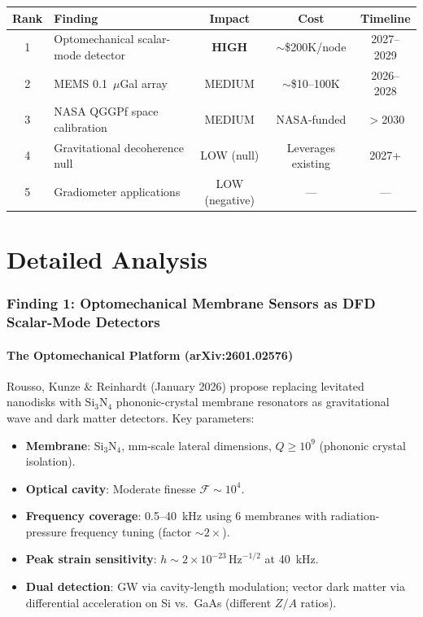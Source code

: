 \documentclass[11pt]{article}
\theoremstyle{definition}
\theoremstyle{remark}
\newcommand{\ee}[1]{\times10^{#1}}
\newcommand{\sqrtHz}{\,\mathrm{Hz}^{-1/2}}
\begin{document}
\begin{table}[H]
\centering
\small
\begin{tabular}{@{}clccc@{}}
\toprule
Rank & Finding & Impact & Cost & Timeline \\
\midrule
1 & Optomechanical scalar-mode detector & \textbf{HIGH} & $\sim$\$200K/node & 2027--2029 \\
2 & MEMS 0.1~$\mu$Gal array & MEDIUM & $\sim$\$10--100K & 2026--2028 \\
3 & NASA QGGPf space calibration & MEDIUM & NASA-funded & $>$2030 \\
4 & Gravitational decoherence null & LOW (null) & Leverages existing & 2027+ \\
5 & Gradiometer applications & LOW (negative) & --- & --- \\
\bottomrule
\end{tabular}
\end{table}

\part{Detailed Analysis}

\section{Finding 1: Optomechanical Membrane Sensors as DFD Scalar-Mode Detectors}
\label{sec:optomech}

\subsection{The Optomechanical Platform (arXiv:2601.02576)}

Rousso, Kunze \& Reinhardt (January 2026) propose replacing levitated
nanodisks with Si$_3$N$_4$ phononic-crystal membrane resonators as
gravitational wave and dark matter detectors. Key parameters:

\begin{itemize}[nosep]
\item \textbf{Membrane}: Si$_3$N$_4$, mm-scale lateral dimensions,
  $Q \geq 10^9$ (phononic crystal isolation).
\item \textbf{Optical cavity}: Moderate finesse $\mathcal{F} \sim 10^4$.
\item \textbf{Frequency coverage}: 0.5--40~kHz using 6 membranes with
  radiation-pressure frequency tuning (factor $\sim 2\times$).
\item \textbf{Peak strain sensitivity}: $h \sim 2\ee{-23}\sqrtHz$ at 40~kHz.
\item \textbf{Dual detection}: GW via cavity-length modulation; vector dark
  matter via differential acceleration on Si vs.\ GaAs (different $Z/A$
  ratios).
\end{itemize}
\end{document}
